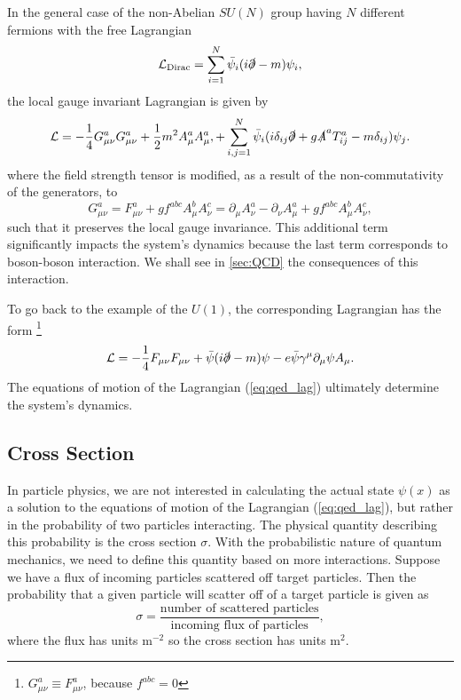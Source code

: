 In the general case of the non-Abelian $SU(N)$ group having $N$ different fermions with the free Lagrangian
\begin{equation}
    \label{eq:Dirac_N}
    \mathcal{L}_{\text{Dirac}} = \sum_{i=1}^N \bar{\psi}_i (i\slashed{\partial} - m) \psi_i,
\end{equation}
the local gauge invariant Lagrangian is given by \cite{schartz}
\begin{equation}
    \label{eq:lag_suN}
    \mathcal{L} = - \frac{1}{4}  G^a_{\mu\nu} G^a_{\mu\nu} + \frac{1}{2} m^2 A^a_\mu A^a_\mu, + \sum_{i,j=1}^N \bar{\psi}_i (i\delta_{ij} \slashed{\partial}  +g \slashed{A}^a T^a_{ij} - m \delta_{ij}) \psi_j.
\end{equation}
where the field strength tensor is modified, as a result of the non-commutativity of the generators, to
\begin{equation}
    \label{eq:field_strength}
    G^a_{\mu\nu} = F^a_{\mu\nu} + g f^{abc} A^b_\mu A^c_\nu = \partial_\mu A^a_\nu - \partial_\nu A^a_\mu + g f^{abc} A^b_\mu A^c_\nu,
\end{equation}
such that it preserves the local gauge invariance.
This additional term significantly impacts the system's dynamics because the last term corresponds to boson-boson interaction.
We shall see in \cref{sec:QCD} the consequences of this interaction.

To go back to the example of the $U(1)$, the corresponding Lagrangian has the form \footnote{$G^a_{\mu\nu} \equiv F^a_{\mu\nu}$, because $f^{abc} = 0$}
\begin{equation}
    \label{eq:qed_lag}
    \mathcal{L} = - \frac{1}{4}  F_{\mu\nu} F_{\mu\nu} + \bar{\psi}(i\slashed{\partial} - m) \psi - e \bar{\psi} \gamma^\mu \partial_\mu \psi A_\mu.
\end{equation}
The equations of motion of the Lagrangian (\ref{eq:qed_lag}) ultimately determine the system's dynamics.

\subsection{Cross Section}
\label{sec:cross_section}
In particle physics, we are not interested in calculating the actual state $\psi(x)$ as a solution to the equations of motion of the Lagrangian (\ref{eq:qed_lag}), but rather in the probability of two particles interacting. 
The physical quantity describing this probability is the cross section $\sigma$.
With the probabilistic nature of quantum mechanics, we need to define this quantity based on more interactions.
Suppose we have a flux of incoming particles scattered off target particles. 
Then the probability that a given particle will scatter off of a target particle is given as 
\begin{equation}
    \label{eq:cross_sec}
    \sigma = \frac{\text{number of scattered particles}}{\text{incoming flux of particles}},
\end{equation}
where the flux has units m$^{-2}$ so the cross section has units m$^{2}$.

